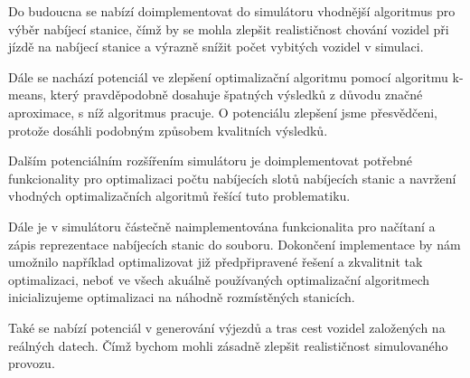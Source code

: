 Do budoucna se nabízí doimplementovat do simulátoru vhodnější algoritmus pro 
výběr nabíjecí stanice, čímž by se mohla zlepšit realističnost chování vozidel
při jízdě na nabíjecí stanice a výrazně snížit počet vybitých vozidel v 
simulaci.

Dále se nachází potenciál ve zlepšení optimalizační 
algoritmu pomocí algoritmu k-means, který pravděpodobně dosahuje špatných výsledků
z důvodu značné aproximace, s níž algoritmus pracuje. O potenciálu zlepšení jsme
přesvědčeni, protože \citet{kmeans_layout} dosáhli podobným způsobem kvalitních
výsledků.

Dalším potenciálním rozšířením simulátoru je doimplementovat potřebné funkcionality
pro optimalizaci počtu nabíjecích slotů nabíjecích stanic a navržení vhodných
optimalizačních algoritmů řešící tuto problematiku.

Dále je v simulátoru částečně naimplementována funkcionalita pro načítaní a zápis
reprezentace nabíjecích stanic do souboru. Dokončení implementace by nám umožnilo
například optimalizovat již předpřipravené řešení a zkvalitnit tak optimalizaci,
neboť ve všech akuálně používaných optimalizační algoritmech inicializujeme 
optimalizaci na náhodně rozmístěných stanicích.

Také se nabízí potenciál v generování výjezdů a tras cest vozidel založených na 
reálných datech. Čímž bychom mohli zásadně zlepšit realističnost simulovaného
provozu. 